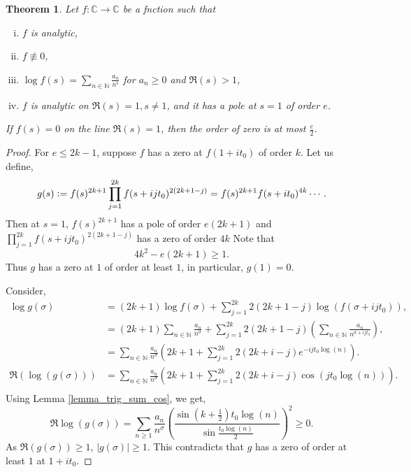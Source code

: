 \documentclass{article}
\newtheorem{theorem}{Theorem} [section]
\newcommand{\defeq}{\vcentcolon=}
\newcommand{\N}[0]{\mathbb{N}}
\newcommand{\C}[0]{\mathbb{C}}
\begin{document}
\begin{theorem}
  Let $f:\C\to\C$ be a fnction such that 
  \begin{enumerate}[i).]
    \item $f$ is analytic,
    \item $f\not\equiv 0$,
    \item $\log f(s) = \sum_{n\in\N}{\frac {a_n} {n^s}}$ for $a_n\geq0$ and $\Re(s)>1$,
    \item $f$ is analytic on $\Re(s)=1,s\not=1$, and it has a pole at $s=1$ of order $e$.
  \end{enumerate}
  If $f(s)=0$ on the line $\Re(s)=1$, then the order of zero is at most ${\frac e 2}$.
\end{theorem}

\begin{proof}
  For $e\leq 2k-1$, suppose $f$ has a zero at $f(1+it_0)$ of order $k$. Let us define,
  \begin{equation*}
    g(s)\defeq f(s)^{2k+1}\prod_{j=1}^{2k}f(s+ijt_0)^{2(2k+1-j)} = f(s)^{2k+1}f(s+it_0)^{4k}\cdots.
  \end{equation*}
  Then at $s=1$, $f(s)^{2k+1}$ has a pole of order $e(2k+1)$ and $\prod_{j=1}^{2k}f(s+ijt_0)^{2(2k+1-j)}$ has a zero of order $4k$
  Note that 
  \begin{equation*}
    4k^2-e(2k+1)\geq1.
  \end{equation*}
  Thus $g$ has a zero at $1$ of order at least $1$, in particular, $g(1) = 0$.
  \par Consider,
  \begin{align*}
    \log g(\sigma) & = (2k+1)\log f(\sigma)+\sum_{j=1}^{2k} 2(2k+1-j)\log(f(\sigma+ijt_0)),\\
    & = (2k+1)\sum_{n\in\N}{\frac {a_n} {n^\sigma}}+\sum_{j=1}^{2k}2(2k+1-j)\left(\sum_{n\in\N}{\frac {a_n} {n^{\sigma+ijt_0}}}\right),\\
    & = \sum_{n\in\N}{\frac {a_n} {n^\sigma}}\left(2k+1+\sum_{j=1}^{2k}2(2k+i-j)e^{-ijt_0\log(n)}\right).\\
    \Re(\log(g(\sigma))) & = \sum_{n\in\N}{\frac {a_n} {n^\sigma}}\left(2k+1+\sum_{j=1}^{2k}2(2k+i-j)\cos(jt_0\log(n))\right).\\
  \end{align*}
  Using Lemma \ref{lemma_trig_sum_cos}, we get,
  \begin{equation*}
    \Re\log(g(\sigma)) = \sum_{n\geq1}{\frac {a_n} {n^\sigma}}\left({\frac {\sin\left(k+{\frac 1 2}\right)t_0\log(n)} {\sin{\frac {t_0\log(n)} 2}}}\right)^2\geq0.
  \end{equation*}
  As $\Re(g(\sigma))\geq1$, $\vert g(\sigma)\vert\geq1$. This contradicts that $g$ has a zero of order at least $1$ at $1+it_0$.
\end{proof}
\end{document}
